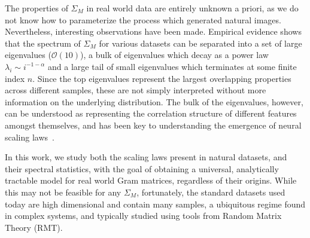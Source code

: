 \documentclass{article}
\begin{document}
The properties of $\Sigma_M$ in real world data are entirely unknown a priori, as we do not know how to parameterize the process which generated natural images. Nevertheless, interesting observations have been made. Empirical evidence shows that the spectrum of $\Sigma_M$ for various datasets can be separated into a set of large eigenvalues ($\mathcal{O}(10)$), a bulk of eigenvalues which decay as a power law $\lambda_i \sim i^{-1-\alpha}$ and a large tail of small eigenvalues which terminates at some finite index $n$. Since the top eigenvalues represent the largest overlapping properties across different samples, these are not simply interpreted without more information on the underlying distribution. The bulk of the eigenvalues, however, can be understood as representing the correlation structure of different features amongst themselves, and has been key to understanding the emergence of neural scaling laws~\citep{kaplan2020scaling, maloney2022solvable}. 

In this work, we study both the scaling laws present in natural datasets, and their spectral statistics, with the goal of obtaining a universal, analytically tractable model for real world Gram matrices, regardless of their origins. While this may not be feasible for any $\Sigma_M$, fortunately, the standard datasets used today are high dimensional and contain many samples, a ubiquitous regime found in complex systems, and typically studied using tools from Random Matrix Theory (RMT).
\end{document}

